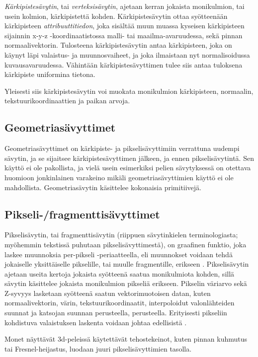 \documentclass[finnish]{tktltiki2}
\theoremstyle{definition}
\theoremstyle{remark}
\begin{document}
\emph{Kärkipistesävytin}, tai \emph{verteksisävytin}, ajetaan kerran jokaista monikulmion, tai usein kolmion, kärkipistettä kohden. Kärkipistesävytin ottaa syötteenään kärkipisteen \emph{attribuuttitiedon}, joka sisältää muun muassa kyseisen kärkipisteen sijainnin x-y-z -koordinaatistossa malli- tai maailma-avaruudessa, sekä pinnan normaalivektorin. Tulosteena kärkipistesävytin antaa kärkipisteen, joka on käynyt läpi valaistus- ja muunnosvaiheet, ja joka ilmaistaan nyt normalisoidussa kuvausavaruudessa. Vähintään kärkipistesävyttimen tulee siis antaa tuloksena kärkipiste uniformina tietona. \cite{Puh08}

Yleisesti siis kärkipistesävytin voi muokata monikulmion kärkipisteen, normaalin, tekstuurikoordinaattien ja paikan arvoja.

\subsection{Geometriasävyttimet}

Geometriasävyttimet on kärkipiste- ja pikselisävyttimiin verrattuna uudempi sävytin, ja se sijaitsee kärkipistesävyttimen jälkeen, ja ennen pikselisävytintä. Sen käyttö ei ole pakollista, ja vielä usein esimerkiksi pelien sävytyksessä on otettava huomioon jonkinlainen varakeino mikäli geometriasävyttimien käyttö ei ole mahdollista. Geometriasävytin käsittelee kokonaisia primitiivejä.

\subsection{Pikseli-/fragmenttisävyttimet}

Pikselisävytin, tai fragmenttisävytin (riippuen sävytinkielen terminologiasta; myöhemmin tekstissä puhutaan pikselisävyttimestä), on graafinen funktio, joka laskee muunnoksia per-pikseli -periaatteella, eli muunnokset voidaan tehdä jokaiselle yksittäiselle pikselille, tai muulle fragmentille, erikseen \cite{}. Pikselisävytin ajetaan useita kertoja jokaista syötteenä saatua monikulmiota kohden, sillä sävytin käsittelee jokaista monikulmion pikseliä erikseen. Pikselin väriarvo sekä Z-syvyys lasketaan syötteenä saatun vektorimuotoisen datan, kuten normaalivektorin, värin, tekstuurikoordinaatit, interpoloidut valonlähteiden suunnat ja katsojan suunnan perusteella, perusteella. Erityisesti pikseliin kohdistuva valaistuksen laskenta voidaan johtaa edellisistä \cite{Puh08}.

Monet näyttävät 3d-peleissä käytettävät tehostekeinot, kuten pinnan kuhmutus tai Fresnel-heijastus, luodaan juuri pikselisävyttimien tasolla.
\end{document}

